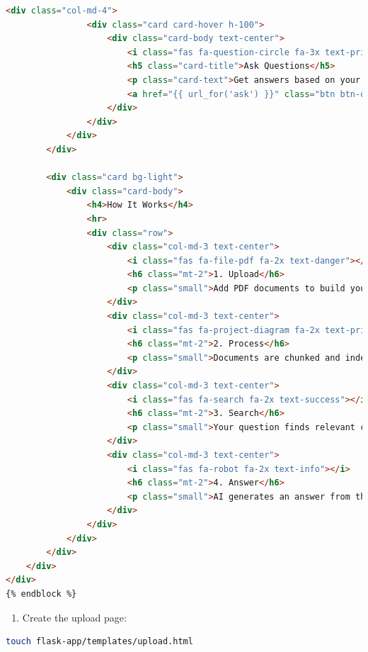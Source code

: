 \documentclass[
  screen,review,acmlarge]{acmart}
\providecommand{\tightlist}{%
  \setlength{\itemsep}{0pt}\setlength{\parskip}{0pt}}
\begin{document}
\begin{lstlisting}[language=HTML]
            <div class="col-md-4">
                <div class="card card-hover h-100">
                    <div class="card-body text-center">
                        <i class="fas fa-question-circle fa-3x text-primary mb-3"></i>
                        <h5 class="card-title">Ask Questions</h5>
                        <p class="card-text">Get answers based on your documents.</p>
                        <a href="{{ url_for('ask') }}" class="btn btn-outline-primary">Ask Now</a>
                    </div>
                </div>
            </div>
        </div>
        
        <div class="card bg-light">
            <div class="card-body">
                <h4>How It Works</h4>
                <hr>
                <div class="row">
                    <div class="col-md-3 text-center">
                        <i class="fas fa-file-pdf fa-2x text-danger"></i>
                        <h6 class="mt-2">1. Upload</h6>
                        <p class="small">Add PDF documents to build your knowledge base</p>
                    </div>
                    <div class="col-md-3 text-center">
                        <i class="fas fa-project-diagram fa-2x text-primary"></i>
                        <h6 class="mt-2">2. Process</h6>
                        <p class="small">Documents are chunked and indexed</p>
                    </div>
                    <div class="col-md-3 text-center">
                        <i class="fas fa-search fa-2x text-success"></i>
                        <h6 class="mt-2">3. Search</h6>
                        <p class="small">Your question finds relevant content</p>
                    </div>
                    <div class="col-md-3 text-center">
                        <i class="fas fa-robot fa-2x text-info"></i>
                        <h6 class="mt-2">4. Answer</h6>
                        <p class="small">AI generates an answer from the sources</p>
                    </div>
                </div>
            </div>
        </div>
    </div>
</div>
{% endblock %}
\end{lstlisting}

\begin{enumerate}
\def\labelenumi{\arabic{enumi}.}
\setcounter{enumi}{6}
\tightlist
\item
  Create the upload page:
\end{enumerate}

\begin{lstlisting}[language=bash]
touch flask-app/templates/upload.html
\end{lstlisting}
\end{document}
